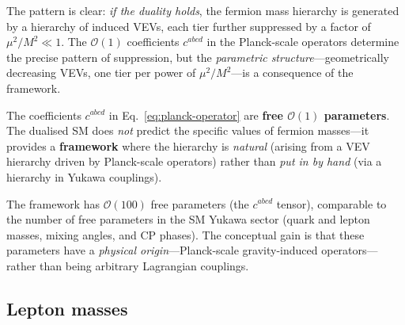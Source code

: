 \documentclass[11pt,a4paper]{article}
\begin{document}
The pattern is clear: \emph{if the duality holds}, the fermion mass
hierarchy is generated by a hierarchy of induced VEVs, each tier
further suppressed by a factor of $\mu^2/M^2 \ll 1$.  The
$\mathcal{O}(1)$ coefficients $c^{abcd}$ in the Planck-scale operators
determine the precise pattern of suppression, but the
\emph{parametric structure}---geometrically decreasing VEVs, one tier
per power of $\mu^2/M^2$---is a consequence of the framework.

\begin{warningbox}[title={Free parameters in the mass hierarchy}]
  The coefficients $c^{abcd}$ in Eq.~\eqref{eq:planck-operator} are
  \textbf{free $\mathcal{O}(1)$ parameters}.  The dualised SM does
  \emph{not} predict the specific values of fermion masses---it provides
  a \textbf{framework} where the hierarchy is \emph{natural} (arising
  from a VEV hierarchy driven by Planck-scale operators) rather than
  \emph{put in by hand} (via a hierarchy in Yukawa couplings).

  \medskip

  The framework has $\mathcal{O}(100)$ free parameters (the $c^{abcd}$
  tensor), comparable to the number of free parameters in the SM
  Yukawa sector (quark and lepton masses, mixing angles, and CP phases).
  The conceptual gain is that these parameters have a
  \emph{physical origin}---Planck-scale gravity-induced
  operators---rather than being arbitrary Lagrangian couplings.
\end{warningbox}

\subsection{Lepton masses}
\end{document}
